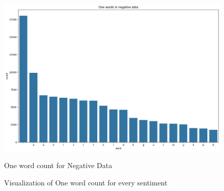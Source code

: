 \documentclass[a4paper]{article}
\theoremstyle{plain}
\theoremstyle{definition}
\begin{document}
\begin{figure}[htbp]
\begin{minipage}[b]{0.3\textwidth}
        \includegraphics[width=\textwidth]{figs/output3.png}
        \caption*{One word count for Negative Data}
        \label{fig:figure5}
    \end{minipage}
    
    \caption{Visualization of One word count for every sentiment}
    \label{fig:dataset_figures}
\end{figure}
\end{document}
